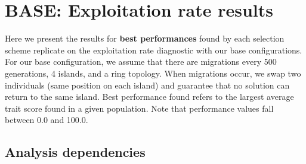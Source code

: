 \documentclass[]{book}
\newenvironment{Shaded}{\begin{snugshade}}{\end{snugshade}}
\newcommand{\CharTok}[1]{\textcolor[rgb]{0.31,0.60,0.02}{#1}}
\newcommand{\DataTypeTok}[1]{\textcolor[rgb]{0.13,0.29,0.53}{#1}}
\newcommand{\KeywordTok}[1]{\textcolor[rgb]{0.13,0.29,0.53}{\textbf{#1}}}
\newcommand{\NormalTok}[1]{#1}
\newcommand{\OperatorTok}[1]{\textcolor[rgb]{0.81,0.36,0.00}{\textbf{#1}}}
\newcommand{\StringTok}[1]{\textcolor[rgb]{0.31,0.60,0.02}{#1}}
\begin{document}
\begin{Shaded}
\end{Shaded}

\hypertarget{base-exploitation-rate-results}{%
\chapter{BASE: Exploitation rate results}\label{base-exploitation-rate-results}}

Here we present the results for \textbf{best performances} found by each selection scheme replicate on the exploitation rate diagnostic with our base configurations.
For our base configuration, we assume that there are migrations every 500 generations, 4 islands, and a ring topology.
When migrations occur, we swap two individuals (same position on each island) and guarantee that no solution can return to the same island.
Best performance found refers to the largest average trait score found in a given population.
Note that performance values fall between 0.0 and 100.0.

\hypertarget{analysis-dependencies}{%
\section{Analysis dependencies}\label{analysis-dependencies}}
\end{document}
